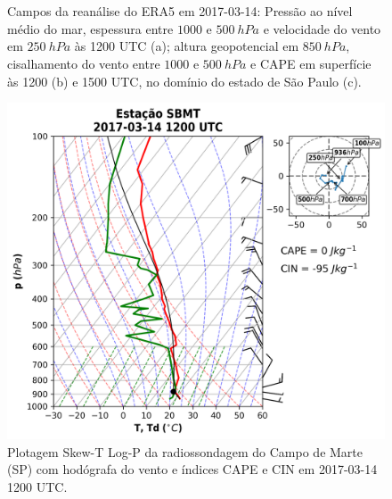 \begin{figure}[hp]
	\begin{center}
		\caption{Campos da reanálise do ERA5 em 2017-03-14: Pressão ao nível médio do mar, espessura entre $1000$ e $500\:hPa$ e velocidade do vento em $250\:hPa$ às 1200 UTC (a); altura geopotencial em $850\:hPa$, cisalhamento do vento entre $1000$ e $500\:hPa$ e CAPE em superfície às 1200 (b) e 1500 UTC, no domínio do estado de São Paulo (c).} 
		\label{era5_20170314_main}
		 \\
		 \\
	\end{center}
\end{figure}

\begin{figure}[hp]
	\begin{center}
		\caption{Plotagem Skew-T Log-P da radiossondagem do Campo de Marte (SP) com hodógrafa do vento e índices CAPE e CIN em 2017-03-14 1200 UTC.} 
		\label{sondagem_20170314}
		\includegraphics[width=0.75\columnwidth]{../Sounding_Processing/figures/sounding_SBMT2017031412UTC_ptbr.png}
	\end{center}
\end{figure}

